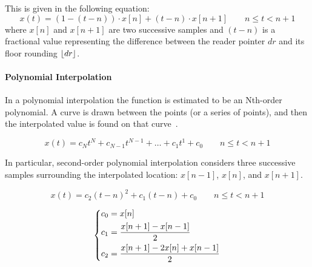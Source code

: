 This is given in the following equation:
\[
	x(t) = (1 - (t - n)) \cdot x[n] + (t-n) \cdot x[n+1] \qquad n \le t < n + 1
\]
where $x[n]$ and $x[n+1]$ are two successive samples and $(t-n)$ is a fractional value representing the difference between the reader pointer $dr$ and its floor rounding $\lfloor dr\rfloor$.

\paragraph{Polynomial Interpolation}
In a polynomial interpolation the function is estimated to be an Nth-order polynomial. A curve is drawn between the points (or a series of points), and then the interpolated value is found on that curve~\cite{pirkle2013designing}.

\[
	x(t) = c_{N}t^{N} + c_{N-1}t^{N-1} + \dots + c_{1}t^{1} + c_{0} \qquad n \le t< n + 1
\]

In particular, second-order polynomial interpolation considers three successive samples surrounding the interpolated location: $x[n-1]$, $x[n]$, and $x[n+1]$. 

\[
	x(t) = c_{2}(t-n)^{2} + c_{1}(t-n) + c_{0} \qquad n \le t < n + 1
\]

\[
	\begin{dcases}
		c_{0} = x[n] \\
		c_{1} = \frac{x[n+1] - x[n-1]}{2} \\
		c_{2} = \frac{x[n+1] - 2 x[n] + x[n-1]}{2} 
	\end{dcases}
\]
